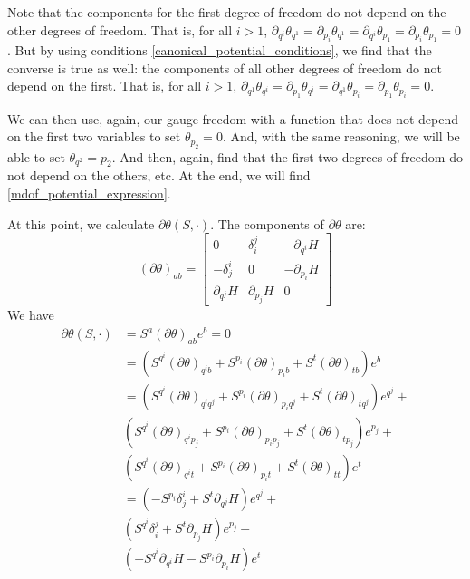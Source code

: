 \documentclass[10pt,twocolumn, nofootinbib]{revtex4-2}
\begin{document}
Note that the components for the first degree of freedom do not depend on the other degrees of freedom. That is, for all $i>1$, $\partial_{q^i} \theta_{q^1} = \partial_{p_i} \theta_{q^1} = \partial_{q^i} \theta_{p_1} = \partial_{p_i} \theta_{p_1} = 0$. But by using conditions \ref{canonical_potential_conditions}, we find that the converse is true as well: the components of all other degrees of freedom do not depend on the first. That is, for all $i>1$, $\partial_{q^1} \theta_{q^i} = \partial_{p_1} \theta_{q^i} = \partial_{q^1} \theta_{p_i} = \partial_{p_1} \theta_{p_i} = 0$.

We can then use, again, our gauge freedom with a function that does not depend on the first two variables to set $\theta_{p_2} = 0$. And, with the same reasoning, we will be able to set $\theta_{q^2} = p_2$. And then, again, find that the first two degrees of freedom do not depend on the others, etc. At the end, we will find \ref{mdof_potential_expression}.

At this point, we calculate $\partial\theta(S, \cdot ) $. The components of $\partial\theta$ are:
\begin{equation*}
	(\partial\theta)_{ab} = \begin{bmatrix}
		0 & \delta^j_i & - \partial_{q^i} H \\
		-\delta^i_j & 0 & - \partial_{p_i} H \\
		\partial_{q^j} H & \partial_{p_j} H & 0
	\end{bmatrix}
\end{equation*}
We have
\begin{align*}
	\partial\theta(S, \cdot )  &= S^a (\partial\theta)_{ab} e^b = 0 \\
	&= (S^{q^i}(\partial\theta)_{q^ib} + S^{p_i}(\partial\theta)_{p_ib} + S^{t}(\partial\theta)_{tb}) e^b \\
	&= (S^{q^i}(\partial\theta)_{q^iq^j} + S^{p_i}(\partial\theta)_{p_iq^j} + S^{t}(\partial\theta)_{tq^j}) e^{q^j} + \\
	& (S^{q^i}(\partial\theta)_{q^ip_j} +  S^{p_i}(\partial\theta)_{p_ip_j} + S^{t}(\partial\theta)_{tp_j}) e^{p_j} + \\
	& (S^{q^i}(\partial\theta)_{q^it} + S^{p_i}(\partial\theta)_{p_it} + S^{t}(\partial\theta)_{tt}) e^t \\
	&= (-S^{p_i}\delta^i_j + S^{t}\partial_{q^j} H ) e^{q^j} + \\
	& (S^{q^i}\delta^j_i +  S^{t}\partial_{p_j} H) e^{p_j} + \\
	& (-S^{q^i} \partial_{q^i} H - S^{p_i} \partial_{p_i} H) e^t \\
\end{align*}
\end{document}
